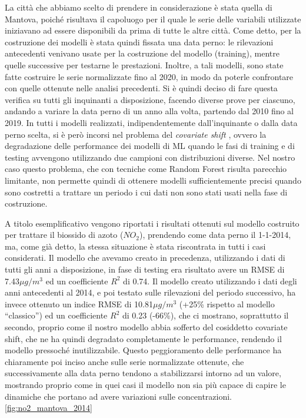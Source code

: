 \documentclass[a4paper]{report}
\begin{document}
La città che abbiamo scelto di prendere in considerazione è stata quella di Mantova, poiché risultava il capoluogo per il quale le serie delle variabili utilizzate iniziavano ad essere disponibili da prima di tutte le altre città. Come detto, per la costruzione dei modelli è stata quindi fissata una data perno: le rilevazioni antecedenti venivano usate per la costruzione del modello (training), mentre quelle successive per testarne le prestazioni. Inoltre, a tali modelli, sono state fatte costruire le serie normalizzate fino al 2020, in modo da poterle confrontare con quelle ottenute nelle analisi precedenti.  
Si è quindi deciso di fare questa verifica su tutti gli inquinanti a disposizione, facendo diverse prove per ciascuno, andando a variare la data perno di un anno alla volta, partendo dal 2010 fino al 2019.  
In tutti i modelli realizzati, indipendentemente dall'inquinante o dalla data perno scelta, si è però incorsi nel problema del \textit{covariate shift} \cite{quinonero2009dataset}, ovvero la degradazione delle performance dei modelli di ML quando le fasi di training e di testing avvengono utilizzando due campioni con distribuzioni diverse. Nel nostro caso questo problema, che con tecniche come Random Forest risulta parecchio limitante, non permette quindi di ottenere modelli sufficientemente precisi quando sono costretti a trattare un periodo i cui dati non sono stati usati nella fase di costruzione.

A titolo esemplificativo vengono riportati i risultati ottenuti sul modello costruito per trattare il biossido di azoto ($NO_2$), prendendo come data perno il 1-1-2014, ma, come già detto, la stessa situazione è stata riscontrata in tutti i casi considerati.
Il modello che avevamo creato in precedenza, utilizzando i dati di tutti gli anni a disposizione, in fase di testing era risultato avere un RMSE di 7.43$\mu g/m^3$ ed un coefficiente $R^2$ di 0.74.  
Il modello creato utilizzando i dati degli anni antecedenti al 2014, e poi testato sulle rilevazioni del periodo successivo, ha invece ottenuto un indice RMSE di 10.81$\mu g/m^3$ (+25\% rispetto al modello ``classico'') ed un coefficiente $R^2$ di 0.23 (-66\%), che ci mostrano, soprattutto il secondo, proprio come il nostro modello abbia sofferto del cosiddetto covariate shift, che ne ha quindi degradato completamente le performance, rendendo il modello pressoché inutilizzabile.  
Questo peggioramento delle performance ha chiaramente poi inciso anche sulle serie normalizzate ottenute, che successivamente alla data perno tendono a stabilizzarsi intorno ad un valore, mostrando proprio come in quei casi il modello non sia più capace di capire le dinamiche che portano ad avere variazioni sulle concentrazioni. \ref{fig:no2_mantova_2014}
\end{document}
